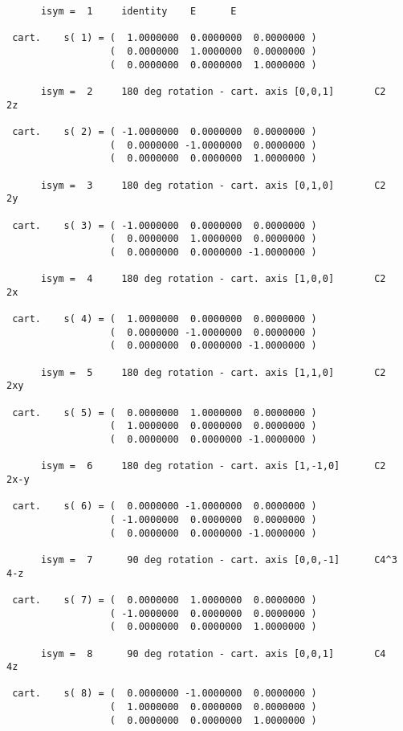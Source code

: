 \documentclass[12pt,a4paper,twoside]{report}
\begin{document}
\begin{tcolorbox}
\begin{scriptsize}
\begin{verbatim}
      isym =  1     identity    E      E

 cart.    s( 1) = (  1.0000000  0.0000000  0.0000000 )
                  (  0.0000000  1.0000000  0.0000000 )
                  (  0.0000000  0.0000000  1.0000000 )

      isym =  2     180 deg rotation - cart. axis [0,0,1]       C2    2z

 cart.    s( 2) = ( -1.0000000  0.0000000  0.0000000 )
                  (  0.0000000 -1.0000000  0.0000000 )
                  (  0.0000000  0.0000000  1.0000000 )

      isym =  3     180 deg rotation - cart. axis [0,1,0]       C2    2y

 cart.    s( 3) = ( -1.0000000  0.0000000  0.0000000 )
                  (  0.0000000  1.0000000  0.0000000 )
                  (  0.0000000  0.0000000 -1.0000000 )

      isym =  4     180 deg rotation - cart. axis [1,0,0]       C2    2x

 cart.    s( 4) = (  1.0000000  0.0000000  0.0000000 )
                  (  0.0000000 -1.0000000  0.0000000 )
                  (  0.0000000  0.0000000 -1.0000000 )

      isym =  5     180 deg rotation - cart. axis [1,1,0]       C2    2xy

 cart.    s( 5) = (  0.0000000  1.0000000  0.0000000 )
                  (  1.0000000  0.0000000  0.0000000 )
                  (  0.0000000  0.0000000 -1.0000000 )

      isym =  6     180 deg rotation - cart. axis [1,-1,0]      C2    2x-y

 cart.    s( 6) = (  0.0000000 -1.0000000  0.0000000 )
                  ( -1.0000000  0.0000000  0.0000000 )
                  (  0.0000000  0.0000000 -1.0000000 )

      isym =  7      90 deg rotation - cart. axis [0,0,-1]      C4^3  4-z

 cart.    s( 7) = (  0.0000000  1.0000000  0.0000000 )
                  ( -1.0000000  0.0000000  0.0000000 )
                  (  0.0000000  0.0000000  1.0000000 )

      isym =  8      90 deg rotation - cart. axis [0,0,1]       C4    4z

 cart.    s( 8) = (  0.0000000 -1.0000000  0.0000000 )
                  (  1.0000000  0.0000000  0.0000000 )
                  (  0.0000000  0.0000000  1.0000000 )


\end{verbatim}
\end{scriptsize}
\end{tcolorbox}
\end{document}
